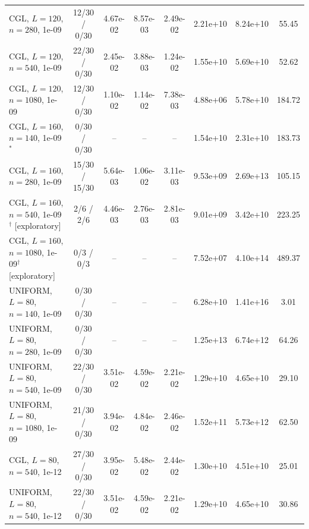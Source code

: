 \begin{table}[t]
\begin{tabular}{lccccccc}
CGL, $L=120$, $n=280$, 1e-09 & 12/30 / 0/30 & 4.67e-02 & 8.57e-03 & 2.49e-02 & 2.21e+10 & 8.24e+10 & 55.45 \\
CGL, $L=120$, $n=540$, 1e-09 & 22/30 / 0/30 & 2.45e-02 & 3.88e-03 & 1.24e-02 & 1.55e+10 & 5.69e+10 & 52.62 \\
CGL, $L=120$, $n=1080$, 1e-09 & 12/30 / 0/30 & 1.10e-02 & 1.14e-02 & 7.38e-03 & 4.88e+06 & 5.78e+10 & 184.72 \\
CGL, $L=160$, $n=140$, 1e-09$^*$ & 0/30 / 0/30 & -- & -- & -- & 1.54e+10 & 2.31e+10 & 183.73 \\
CGL, $L=160$, $n=280$, 1e-09 & 15/30 / 15/30 & 5.64e-03 & 1.06e-02 & 3.11e-03 & 9.53e+09 & 2.69e+13 & 105.15 \\
CGL, $L=160$, $n=540$, 1e-09$^\dagger$ [exploratory] & 2/6 / 2/6 & 4.46e-03 & 2.76e-03 & 2.81e-03 & 9.01e+09 & 3.42e+10 & 223.25 \\
CGL, $L=160$, $n=1080$, 1e-09$^\dagger$ [exploratory] & 0/3 / 0/3 & -- & -- & -- & 7.52e+07 & 4.10e+14 & 489.37 \\
UNIFORM, $L=80$, $n=140$, 1e-09 & 0/30 / 0/30 & -- & -- & -- & 6.28e+10 & 1.41e+16 & 3.01 \\
UNIFORM, $L=80$, $n=280$, 1e-09 & 0/30 / 0/30 & -- & -- & -- & 1.25e+13 & 6.74e+12 & 64.26 \\
UNIFORM, $L=80$, $n=540$, 1e-09 & 22/30 / 0/30 & 3.51e-02 & 4.59e-02 & 2.21e-02 & 1.29e+10 & 4.65e+10 & 29.10 \\
UNIFORM, $L=80$, $n=1080$, 1e-09 & 21/30 / 0/30 & 3.94e-02 & 4.84e-02 & 2.46e-02 & 1.52e+11 & 5.73e+12 & 62.50 \\
CGL, $L=80$, $n=540$, 1e-12 & 27/30 / 0/30 & 3.95e-02 & 5.48e-02 & 2.44e-02 & 1.30e+10 & 4.51e+10 & 25.01 \\
UNIFORM, $L=80$, $n=540$, 1e-12 & 22/30 / 0/30 & 3.51e-02 & 4.59e-02 & 2.21e-02 & 1.29e+10 & 4.65e+10 & 30.86 \\
\bottomrule
\end{tabular}
\end{table}
